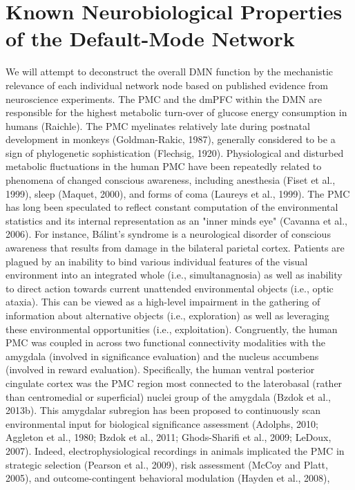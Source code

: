 \documentclass{article} %
\begin{document}
\section{Known Neurobiological Properties of the Default-Mode Network}
We will attempt to deconstruct the overall DMN function
by the mechanistic relevance of each individual network node
based on published evidence from neuroscience experiments.
%
The PMC and the dmPFC within the DMN
are responsible for the highest metabolic turn-over
of glucose energy consumption in humans (Raichle).
The PMC myelinates relatively late during postnatal development in monkeys
(Goldman-Rakic, 1987), generally considered to
be a sign of phylogenetic sophistication (Flechsig, 1920).
Physiological and disturbed metabolic fluctuations in the
human PMC have been repeatedly related to
phenomena of changed conscious awareness,
including anesthesia (Fiset et al., 1999),
sleep (Maquet, 2000), and forms of coma (Laureys et al., 1999).      
%
The PMC has long been speculated to reflect constant computation of
the environmental statistics and its internal representation
as an "inner minds eye" (Cavanna et al., 2006).
For instance, B\'alint's syndrome is a neurological disorder of conscious
awareness that results from damage in the bilateral parietal cortex.
Patients are plagued by an
inability to bind various individual features of the visual
environment into an integrated whole (i.e., simultanagnosia)
as well as inability to direct action towards 
current unattended environmental objects
(i.e., optic ataxia).
This can be viewed as a high-level impairment in the gathering
of information about alternative objects (i.e., exploration) as well as
leveraging these environmental opportunities (i.e., exploitation).
Congruently,
the human PMC was coupled in across two functional connectivity modalities
with the amygdala
(involved in significance evaluation) and
the nucleus accumbens (involved in reward evaluation).
Specifically, the human ventral posterior cingulate cortex was
the PMC region most connected to the laterobasal
(rather than centromedial or superficial) nuclei group
of the amygdala (Bzdok et al., 2013b).
This amygdalar subregion has been proposed to
continuously scan environmental input
for biological significance assessment
(Adolphs, 2010; Aggleton et al., 1980; Bzdok et al., 2011;
Ghods-Sharifi et al., 2009; LeDoux, 2007).
%
Indeed,
electrophysiological recordings in animals implicated the PMC in
strategic selection (Pearson et al., 2009), risk assessment (McCoy and Platt, 2005),
and outcome-contingent behavioral modulation (Hayden et al., 2008),
\end{document}
